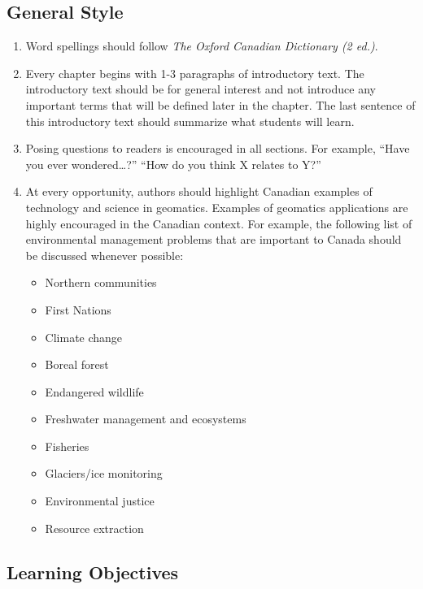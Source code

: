 \documentclass[
]{book}
\providecommand{\tightlist}{%
  \setlength{\itemsep}{0pt}\setlength{\parskip}{0pt}}
\begin{document}
\hypertarget{general-style}{%
\subsection{General Style}\label{general-style}}

\begin{enumerate}
\def\labelenumi{\arabic{enumi}.}
\tightlist
\item
  Word spellings should follow \emph{The Oxford Canadian Dictionary (2 ed.)}.
\item
  Every chapter begins with 1-3 paragraphs of introductory text. The introductory text should be for general interest and not introduce any important terms that will be defined later in the chapter. The last sentence of this introductory text should summarize what students will learn.
\item
  Posing questions to readers is encouraged in all sections. For example, ``Have you ever wondered\ldots?'' ``How do you think X relates to Y?''
\item
  At every opportunity, authors should highlight Canadian examples of technology and science in geomatics. Examples of geomatics applications are highly encouraged in the Canadian context. For example, the following list of environmental management problems that are important to Canada should be discussed whenever possible:

  \begin{itemize}
  \tightlist
  \item
    Northern communities
  \item
    First Nations
  \item
    Climate change
  \item
    Boreal forest
  \item
    Endangered wildlife
  \item
    Freshwater management and ecosystems
  \item
    Fisheries
  \item
    Glaciers/ice monitoring
  \item
    Environmental justice
  \item
    Resource extraction
  \end{itemize}
\end{enumerate}

\hypertarget{learning-objectives}{%
\subsection{Learning Objectives}\label{learning-objectives}}
\end{document}
